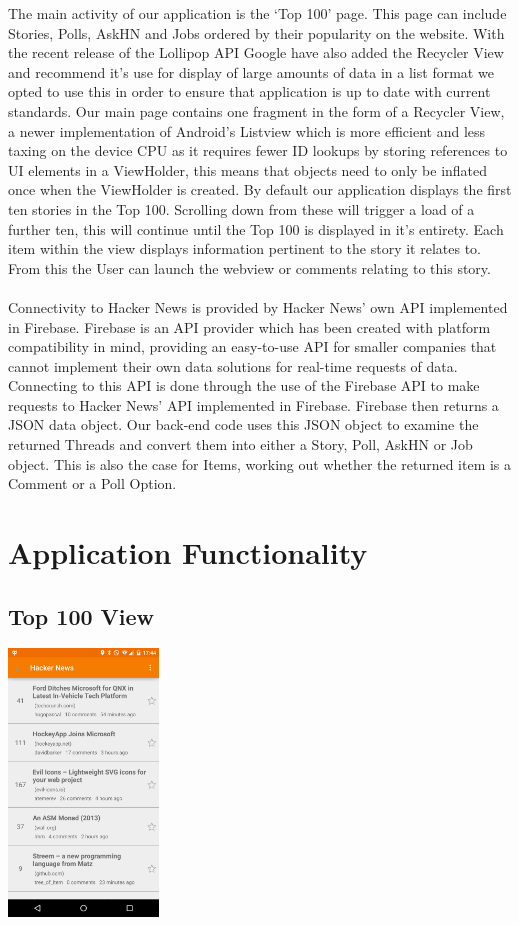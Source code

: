 \documentclass[11pt]{article}
\begin{document}
The main activity of our application is the ‘Top 100’ page. This page can include Stories, Polls, AskHN and Jobs ordered by their popularity on the website. With the recent release of the Lollipop API Google have also added the Recycler View and recommend it’s use for display of large amounts of data in a list format we opted to use this in order to ensure that application is up to date with current standards. Our main page contains one fragment in the form of a Recycler View, a newer implementation of Android’s Listview which is more efficient and less taxing on the device CPU as it requires  fewer ID lookups by storing references to UI elements in a ViewHolder, this means that objects need to only be inflated once when the ViewHolder is created. By default our application displays the first ten stories in the Top 100. Scrolling down from these will trigger a load of a further ten, this will continue until the Top 100 is displayed in it’s entirety. Each item within the view displays information pertinent to the story it relates to. From this the User can launch the webview or comments relating to this story.
\\
\\
Connectivity to Hacker News is provided by Hacker News’ own API implemented in Firebase. Firebase is an API provider which has been created with platform compatibility in mind, providing an easy-to-use API for smaller companies that cannot implement their own data solutions for real-time requests of data. Connecting to this API is done through the use of the Firebase API to make requests to Hacker News’ API implemented in Firebase. Firebase then returns a JSON data object. Our back-end code uses this JSON object to examine the returned Threads and convert them into either a Story, Poll, AskHN or Job object. This is also the case for Items, working out whether the returned item is a Comment or a Poll Option.

\section*{Application Functionality}

\subsection*{Top 100 View}
\begin{center}
\includegraphics[width=0.3\textwidth]{threadView.png}
\end{center}
\end{document}
